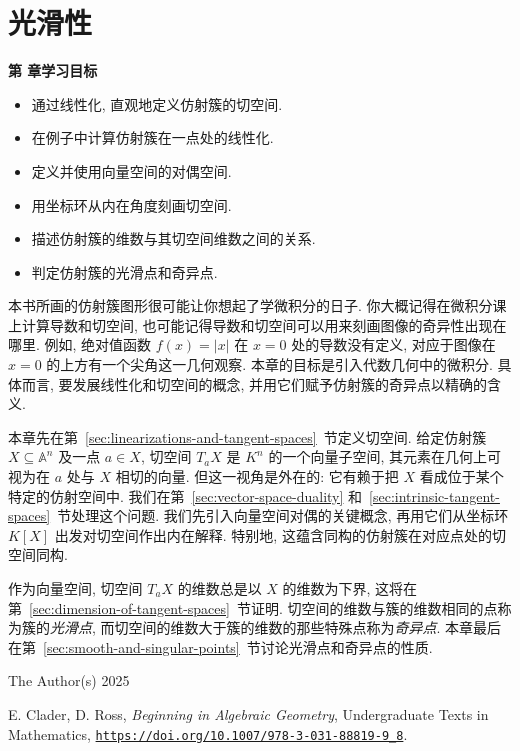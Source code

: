 \chapter{光滑性}\label{chap:smoothness}

\noindent\textbf{第 \thechapter{} 章学习目标}
\begin{itemize}
  \item 通过线性化, 直观地定义仿射簇的切空间.
  \item 在例子中计算仿射簇在一点处的线性化.
  \item 定义并使用向量空间的对偶空间.
  \item 用坐标环从内在角度刻画切空间.
  \item 描述仿射簇的维数与其切空间维数之间的关系.
  \item 判定仿射簇的光滑点和奇异点.
\end{itemize}

本书所画的仿射簇图形很可能让你想起了学微积分的日子. 你大概记得在微积分课上计算导数和切空间, 也可能记得导数和切空间可以用来刻画图像的\textquotedbl{}奇异性\textquotedbl{}出现在哪里. 例如, 绝对值函数 $f(x)=|x|$ 在 $x=0$ 处的导数没有定义, 对应于图像在 $x=0$ 的上方有一个\textquotedbl{}尖角\textquotedbl{}这一几何观察. 本章的目标是引入代数几何中的\textquotedbl{}微积分\textquotedbl{}. 具体而言, 要发展线性化和切空间的概念, 并用它们赋予仿射簇的奇异点以精确的含义.

本章先在第~\ref{sec:linearizations-and-tangent-spaces}~节定义切空间. 给定仿射簇 $X\subseteq\mathbb{A}^{n}$ 及一点 $a\in X$, 切空间 $T_{a}X$ 是 $K^{n}$ 的一个向量子空间, 其元素在几何上可视为在 $a$ 处与 $X$ 相切的向量. 但这一视角是外在的: 它有赖于把 $X$ 看成位于某个特定的仿射空间中. 我们在第~\ref{sec:vector-space-duality} 和~\ref{sec:intrinsic-tangent-spaces}~节处理这个问题. 我们先引入向量空间对偶的关键概念, 再用它们从坐标环 $K[X]$ 出发对切空间作出内在解释. 特别地, 这蕴含同构的仿射簇在对应点处的切空间同构.

作为向量空间, 切空间 $T_{a}X$ 的维数总是以 $X$ 的维数为下界, 这将在第~\ref{sec:dimension-of-tangent-spaces}~节证明. 切空间的维数与簇的维数相同的点称为簇的\emph{光滑点}, 而切空间的维数大于簇的维数的那些特殊点称为\emph{奇异点}. 本章最后在第~\ref{sec:smooth-and-singular-points}~节讨论光滑点和奇异点的性质.

\par\smallskip
{\footnotesize
\noindent\textcopyright{} The Author(s) 2025\par
\noindent E. Clader, D. Ross, \emph{Beginning in Algebraic Geometry}, Undergraduate Texts in Mathematics,
\href{https://doi.org/10.1007/978-3-031-88819-9_8}{\nolinkurl{https://doi.org/10.1007/978-3-031-88819-9_8}}.\par}

